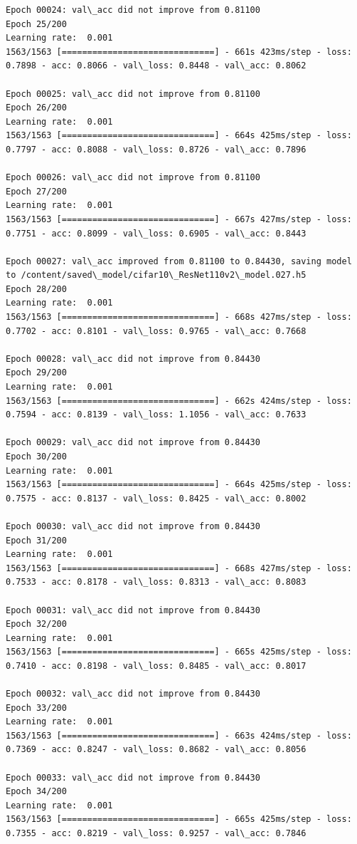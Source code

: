\documentclass[11pt]{article}
\begin{document}
\begin{Verbatim}[commandchars=\\\{\}]
Epoch 00024: val\_acc did not improve from 0.81100
Epoch 25/200
Learning rate:  0.001
1563/1563 [==============================] - 661s 423ms/step - loss: 0.7898 - acc: 0.8066 - val\_loss: 0.8448 - val\_acc: 0.8062

Epoch 00025: val\_acc did not improve from 0.81100
Epoch 26/200
Learning rate:  0.001
1563/1563 [==============================] - 664s 425ms/step - loss: 0.7797 - acc: 0.8088 - val\_loss: 0.8726 - val\_acc: 0.7896

Epoch 00026: val\_acc did not improve from 0.81100
Epoch 27/200
Learning rate:  0.001
1563/1563 [==============================] - 667s 427ms/step - loss: 0.7751 - acc: 0.8099 - val\_loss: 0.6905 - val\_acc: 0.8443

Epoch 00027: val\_acc improved from 0.81100 to 0.84430, saving model to /content/saved\_model/cifar10\_ResNet110v2\_model.027.h5
Epoch 28/200
Learning rate:  0.001
1563/1563 [==============================] - 668s 427ms/step - loss: 0.7702 - acc: 0.8101 - val\_loss: 0.9765 - val\_acc: 0.7668

Epoch 00028: val\_acc did not improve from 0.84430
Epoch 29/200
Learning rate:  0.001
1563/1563 [==============================] - 662s 424ms/step - loss: 0.7594 - acc: 0.8139 - val\_loss: 1.1056 - val\_acc: 0.7633

Epoch 00029: val\_acc did not improve from 0.84430
Epoch 30/200
Learning rate:  0.001
1563/1563 [==============================] - 664s 425ms/step - loss: 0.7575 - acc: 0.8137 - val\_loss: 0.8425 - val\_acc: 0.8002

Epoch 00030: val\_acc did not improve from 0.84430
Epoch 31/200
Learning rate:  0.001
1563/1563 [==============================] - 668s 427ms/step - loss: 0.7533 - acc: 0.8178 - val\_loss: 0.8313 - val\_acc: 0.8083

Epoch 00031: val\_acc did not improve from 0.84430
Epoch 32/200
Learning rate:  0.001
1563/1563 [==============================] - 665s 425ms/step - loss: 0.7410 - acc: 0.8198 - val\_loss: 0.8485 - val\_acc: 0.8017

Epoch 00032: val\_acc did not improve from 0.84430
Epoch 33/200
Learning rate:  0.001
1563/1563 [==============================] - 663s 424ms/step - loss: 0.7369 - acc: 0.8247 - val\_loss: 0.8682 - val\_acc: 0.8056

Epoch 00033: val\_acc did not improve from 0.84430
Epoch 34/200
Learning rate:  0.001
1563/1563 [==============================] - 665s 425ms/step - loss: 0.7355 - acc: 0.8219 - val\_loss: 0.9257 - val\_acc: 0.7846


\end{Verbatim}
\end{document}

